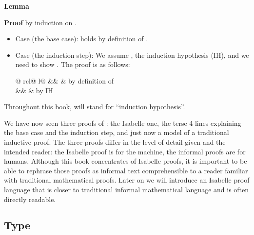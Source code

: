 \begin{isabellebody}
\begin{isamarkuptxt}
\noindent
\textbf{Lemma} 

\noindent
\textbf{Proof} by induction on .
\begin{itemize}
\item Case  (the base case): 
  holds by definition of .
\item Case  (the induction step):
  We assume , the induction hypothesis (IH),
  and we need to show .
  The proof is as follows:\smallskip

  \begin{tabular}{@ {}rcl@ {\quad}l@ {}}
   && 
  & by definition of \\
              &&  & by IH
  \end{tabular}
\end{itemize}
Throughout this book,  will stand for ``induction hypothesis''.

We have now seen three proofs of : the Isabelle one, the
terse 4 lines explaining the base case and the induction step, and just now a
model of a traditional inductive proof. The three proofs differ in the level
of detail given and the intended reader: the Isabelle proof is for the
machine, the informal proofs are for humans. Although this book concentrates
of Isabelle proofs, it is important to be able to rephrase those proofs
as informal text comprehensible to a reader familiar with traditional
mathematical proofs. Later on we will introduce an Isabelle proof language
that is closer to traditional informal mathematical language and is often
directly readable.

\subsection{Type }


\end{isamarkuptxt}
\end{isabellebody}
